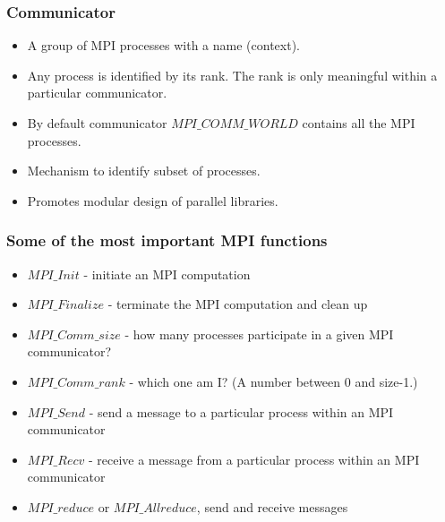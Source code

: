 \documentclass{beamer}
\begin{document}
\begin{frame}
\frametitle{Communicator}

\begin{block}{}
\begin{itemize}
\item A group of MPI processes with a name (context).

\item Any process is identified by its rank. The rank is only meaningful within a particular communicator.

\item By default communicator $MPI\_COMM\_WORLD$ contains all the MPI processes.

\item Mechanism to identify subset of processes.

\item Promotes modular design of parallel libraries.
\end{itemize}

\noindent
\end{block}
\end{frame}

\begin{frame}
\frametitle{Some of the most  important MPI functions}

\begin{block}{}



\begin{itemize}
\item $MPI\_Init$ - initiate an MPI computation

\item $MPI\_Finalize$ - terminate the MPI computation and clean up

\item $MPI\_Comm\_size$ - how many processes participate in a given MPI communicator?

\item $MPI\_Comm\_rank$ - which one am I? (A number between 0 and size-1.)

\item $MPI\_Send$ - send a message to a particular process within an MPI communicator

\item $MPI\_Recv$ - receive a message from a particular process within an MPI communicator

\item $MPI\_reduce$  or $MPI\_Allreduce$, send and receive messages
\end{itemize}

\noindent
\end{block}
\end{frame}
\end{document}
